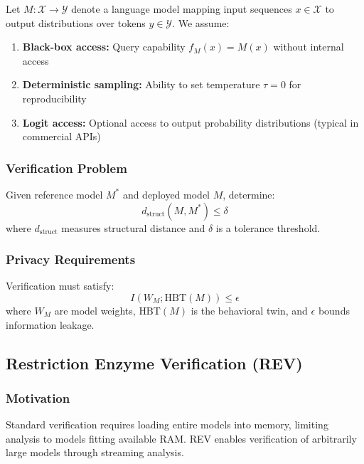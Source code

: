 \documentclass[11pt,a4paper]{article}
\begin{document}
Let $M: \mathcal{X} \to \mathcal{Y}$ denote a language model mapping input sequences $x \in \mathcal{X}$ to output distributions over tokens $y \in \mathcal{Y}$. We assume:

\begin{enumerate}
\item \textbf{Black-box access:} Query capability $f_M(x) = M(x)$ without internal access
\item \textbf{Deterministic sampling:} Ability to set temperature $\tau = 0$ for reproducibility
\item \textbf{Logit access:} Optional access to output probability distributions (typical in commercial APIs)
\end{enumerate}

\subsubsection{Verification Problem}

Given reference model $M^*$ and deployed model $M$, determine:
\begin{equation}
d_{\text{struct}}(M, M^*) \leq \delta
\end{equation}
where $d_{\text{struct}}$ measures structural distance and $\delta$ is a tolerance threshold.

\subsubsection{Privacy Requirements}

Verification must satisfy:
\begin{equation}
I(W_M; \text{HBT}(M)) \leq \epsilon
\end{equation}
where $W_M$ are model weights, $\text{HBT}(M)$ is the behavioral twin, and $\epsilon$ bounds information leakage.

\subsection{Restriction Enzyme Verification (REV)}

\subsubsection{Motivation}

Standard verification requires loading entire models into memory, limiting analysis to models fitting available RAM. REV enables verification of arbitrarily large models through streaming analysis.
\end{document}
